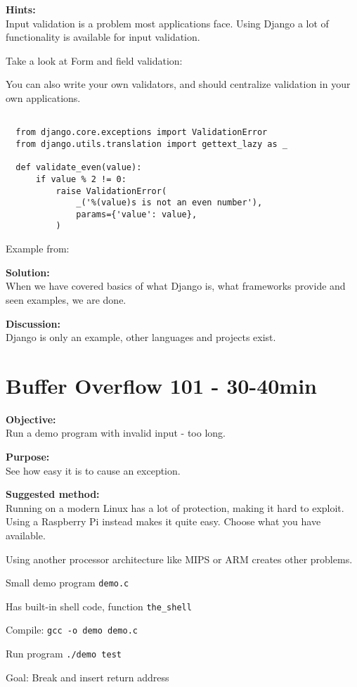 \documentclass[a4paper,11pt,notitlepage]{report}
\begin{document}
{\bf Hints:}\\
Input validation is a problem most applications face. Using Django a lot of functionality is available for input validation.

Take a look at Form and field validation:\\

You can also write your own validators, and should centralize validation in your own applications.

\begin{verbatim}

  from django.core.exceptions import ValidationError
  from django.utils.translation import gettext_lazy as _

  def validate_even(value):
      if value % 2 != 0:
          raise ValidationError(
              _('%(value)s is not an even number'),
              params={'value': value},
          )
\end{verbatim}

Example from:

{\bf Solution:}\\
When we have covered basics of what Django is, what frameworks provide and seen examples, we are done.

{\bf Discussion:}\\
Django is only an example, other languages and projects exist.


\chapter{Buffer Overflow 101 - 30-40min}
\label{ex:bufferoverflow}


{\bf Objective:}\\
Run a demo program with invalid input - too long.

{\bf Purpose:}\\
See how easy it is to cause an exception.

{\bf Suggested method:}\\

Running on a modern Linux has a lot of protection, making it hard to exploit. Using a Raspberry Pi instead makes it quite easy. Choose what you have available.

Using another processor architecture like MIPS or ARM creates other problems.

\begin{list2}
\item Small demo program \verb+demo.c+
\item Has built-in shell code, function \verb+the_shell+
\item Compile:
\verb+gcc -o demo demo.c+
\item Run program
\verb+./demo test+
\item Goal: Break and insert return address
\end{list2}
\end{document}
